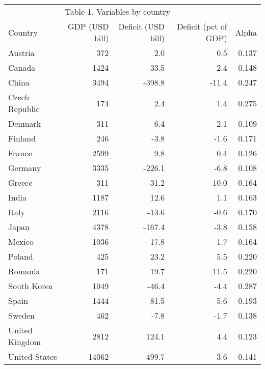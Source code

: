 \begin{tabular}{lrrrr} \hline
 \multicolumn{4}{c}{Table 1. Variables by country} \\ \cline{1-5}
 Country & GDP (USD bill) & Deficit (USD bill) & Deficit (pct of GDP) & Alpha \\ \hline
Austria&372&2.0&0.5&0.137\\
Canada&1424&33.5&2.4&0.148\\
China&3494&-398.8&-11.4&0.247\\
Czech Republic&174&2.4&1.4&0.275\\
Denmark&311&6.4&2.1&0.109\\
Finland&246&-3.8&-1.6&0.171\\
France&2599&9.8&0.4&0.126\\
Germany&3335&-226.1&-6.8&0.108\\
Greece&311&31.2&10.0&0.164\\
India&1187&12.6&1.1&0.163\\
Italy&2116&-13.6&-0.6&0.170\\
Japan&4378&-167.4&-3.8&0.158\\
Mexico&1036&17.8&1.7&0.164\\
Poland&425&23.2&5.5&0.220\\
Romania&171&19.7&11.5&0.220\\
South Korea&1049&-46.4&-4.4&0.287\\
Spain&1444&81.5&5.6&0.193\\
Sweden&462&-7.8&-1.7&0.138\\
United Kingdom&2812&124.1&4.4&0.123\\
United States&14062&499.7&3.6&0.141\\
\hline \end{tabular}
